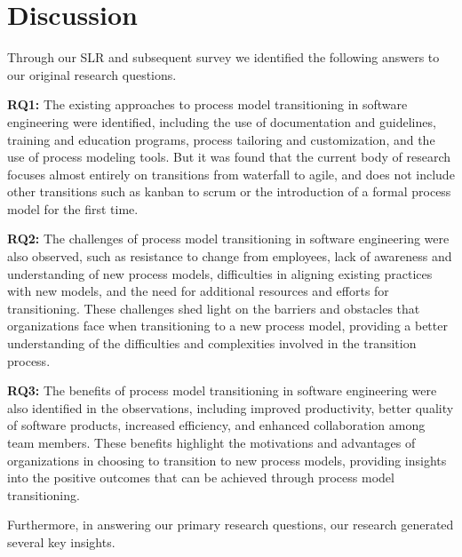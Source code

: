 \documentclass[conference]{IEEEtran}
\begin{document}
\section{Discussion}

Through our SLR and subsequent survey we identified the following answers to our original research questions.

\textbf{RQ1:} The existing approaches to process model transitioning in software engineering were identified, including the use of documentation and guidelines, training and education programs, process tailoring and customization, and the use of process modeling tools. But it was found that the current body of research focuses almost entirely on transitions from waterfall to agile, and does not include other transitions such as kanban to scrum or the introduction of a formal process model for the first time. 

\textbf{RQ2:} The challenges of process model transitioning in software engineering were also observed, such as resistance to change from employees, lack of awareness and understanding of new process models, difficulties in aligning existing practices with new models, and the need for additional resources and efforts for transitioning. These challenges shed light on the barriers and obstacles that organizations face when transitioning to a new process model, providing a better understanding of the difficulties and complexities involved in the transition process.

\textbf{RQ3:} The benefits of process model transitioning in software engineering were also identified in the observations, including improved productivity, better quality of software products, increased efficiency, and enhanced collaboration among team members. These benefits highlight the motivations and advantages of organizations in choosing to transition to new process models, providing insights into the positive outcomes that can be achieved through process model transitioning.

Furthermore, in answering our primary research questions, our research generated several key insights.
\end{document}
